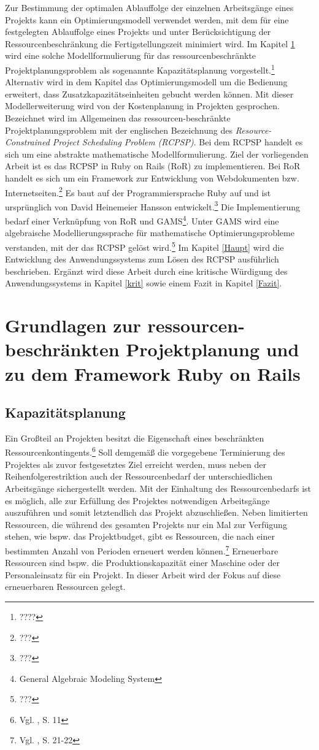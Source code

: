 \documentclass[a4paper,12pt,parskip,bibtotoc,liststotoc]{article}
\begin{document}
Zur Bestimmung der optimalen Ablauffolge der einzelnen Arbeitsgänge eines Projekts kann ein Optimierungsmodell verwendet werden, mit dem für eine festgelegten Ablauffolge eines Projekts und unter Berücksichtigung der Ressourcenbeschränkung die Fertigstellungszeit minimiert wird. Im Kapitel \ref{Grund} wird eine solche Modellformulierung für das ressourcenbeschränkte Projektplanungsproblem als sogenannte Kapazitätsplanung vorgestellt.\footnote{????} Alternativ wird in dem Kapitel das Optimierungsmodell um die Bedienung erweitert, dass  Zusatzkapazitätseinheiten gebucht werden können. Mit dieser Modellerweiterung wird von der Kostenplanung in Projekten gesprochen. Bezeichnet wird im Allgemeinen das ressourcen-beschränkte Projektplanungsproblem  mit der englischen Bezeichnung des \textit{Resource-Con\-strained Project Scheduling Problem (RCPSP)}. Bei dem RCPSP handelt es sich um eine abstrakte mathematische Modellformulierung. Ziel der vorliegenden Arbeit ist es das RCPSP in Ruby on Rails (RoR) zu implementieren. Bei RoR handelt es sich um ein Framework zur Entwicklung von Webdokumenten bzw. Internetseiten.\footnote{???} Es baut auf der Programmiersprache Ruby auf und ist ursprünglich von David Heinemeier Hansson entwickelt.\footnote{???} Die Implementierung bedarf einer Verknüpfung von RoR und GAMS\footnote{General Algebraic Modeling System}. Unter GAMS wird eine algebraische Modellierungssprache für mathematische Optimierungsprobleme verstanden, mit der das RCPSP gelöst wird.\footnote{???} Im Kapitel \ref{Haupt} wird die Entwicklung des Anwendungssystems zum Lösen des RCPSP ausführlich beschrieben. Ergänzt wird diese Arbeit durch eine kritische Würdigung des Anwendungssystems in Kapitel \ref{krit} sowie einem Fazit in Kapitel \ref{Fazit}.

\section{Grundlagen zur ressourcen-beschränkten Projektplanung und zu dem Framework Ruby on Rails} \label{Grund}
\subsection{Kapazitätsplanung}
Ein Großteil an Projekten besitzt die Eigenschaft eines beschränkten Ressourcenkontingents.\footnote{Vgl. \cite{kellenbrink2014einfuhrung}, S. 11} Soll demgemäß die vorgegebene Terminierung des Projektes als zuvor festgesetztes Ziel erreicht werden, muss neben der Reihenfolgerestriktion auch der Ressourcenbedarf der unterschiedlichen Arbeitsgänge sichergestellt werden. Mit der Einhaltung des Ressourcenbedarfs ist es möglich, alle zur Erfüllung des Projektes notwendigen Arbeitsgänge auszuführen und somit letztendlich das Projekt abzuschließen. Neben limitierten Ressourcen, die während des gesamten Projekts nur ein Mal zur Verfügung stehen, wie bspw. das Projektbudget, gibt es Ressourcen, die nach einer bestimmten Anzahl von Perioden erneuert werden können.\footnote{Vgl. \cite{neumann2003project}, S. 21-22} Erneuerbare Ressourcen sind bspw. die Produktionskapazität einer Maschine oder der Personaleinsatz für ein Projekt. In dieser Arbeit wird der Fokus auf diese erneuerbaren Ressourcen gelegt.\\
\end{document}
